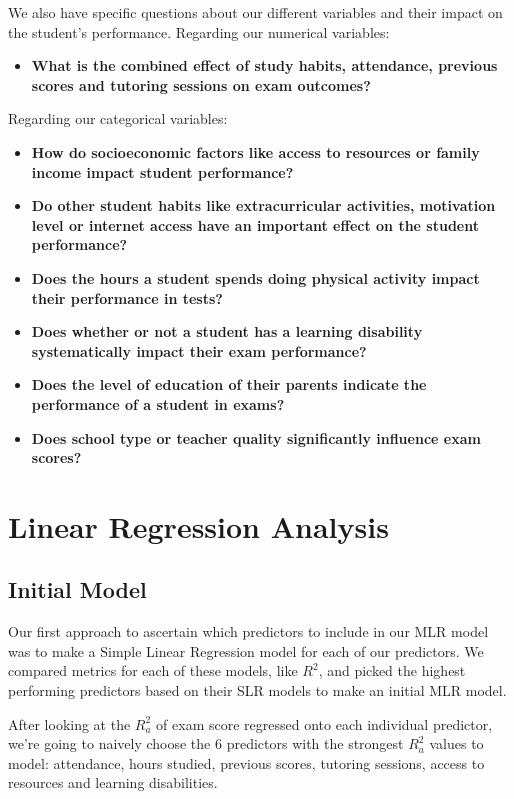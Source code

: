 \documentclass[twocolumn]{article} %
\begin{document}
We also have specific questions about our different variables and their impact on the student's performance.
\newline\newline
Regarding our numerical variables:
\begin{itemize}
\item
      \textbf{What is the combined effect of study habits, attendance, previous scores and tutoring sessions on exam outcomes?}
\end{itemize}
Regarding our categorical variables:
\begin{itemize}
\item
    \textbf{How do socioeconomic factors like access to resources or family income impact student performance?}
\item
    \textbf{Do other student habits like extracurricular activities, motivation level or internet access have an important effect on the student performance?}
\item
    \textbf{Does the hours a student spends doing physical activity impact their performance in tests?}
\item
    \textbf{Does whether or not a student has a learning disability systematically impact their exam performance?}
\item
    \textbf{Does the level of education of their parents indicate the performance of a student in exams?}
\item
    \textbf{Does school type or teacher quality significantly influence exam scores?}
\end{itemize}

\section{Linear Regression Analysis}

\subsection*{Initial Model}

Our first approach to ascertain which predictors to include in our MLR model was to make a Simple Linear Regression model for each of our predictors. We compared metrics for each of these models, like $R^2$, and picked the highest performing predictors based on their SLR models to make an initial MLR model.

After looking at the $R^2_a$ of exam score regressed onto each individual predictor, we're going to naively choose the 6 predictors with the strongest $R^2_a$ values to model: attendance, hours studied, previous scores, tutoring sessions, access to resources and learning disabilities.
\end{document}
